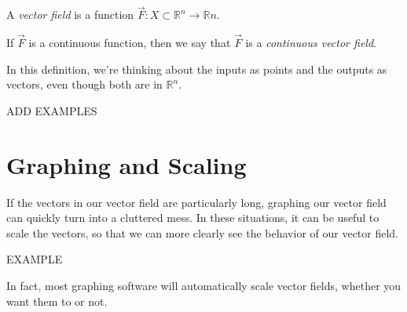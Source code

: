 \documentclass{ximera}
\begin{document}
\begin{definition}
A \emph{vector field} is a function $\vec{F}:X\subset\mathbb{R}^n\rightarrow\mathbb{R}n$.

If $\vec{F}$ is a continuous function, then we say that $\vec{F}$ is a \emph{continuous vector field}.
\end{definition}

In this definition, we're thinking about the inputs as points and the outputs as vectors, even though both are in $\mathbb{R}^n$.

ADD EXAMPLES

\section*{Graphing and Scaling}

If the vectors in our vector field are particularly long, graphing our vector field can quickly turn into a cluttered mess. In these situations, it can be useful to scale the vectors, so that we can more clearly see the behavior of our vector field.

EXAMPLE

In fact, most graphing software will automatically scale vector fields, whether you want them to or not.
\end{document}
